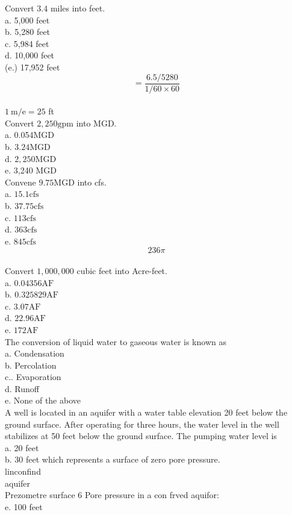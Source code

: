 Convert $3.4$ miles into feet.\\
a. 5,000 feet\\
b. 5,280 feet\\
c. 5,984 feet\\
d. 10,000 feet\\
(e.) 17,952 feet\\
$$=\frac{6.5 / 5280}{1 / 60 \times 60}$$\\
$1 \mathrm{~m} / \mathrm{e}=25$ ft\\

Convert $2,250 \mathrm{gpm}$ into MGD.\\
a. 0.054MGD\\
b. $3.24 \mathrm{MGD}$\\
d. $2,250 \mathrm{MGD}$\\
e. 3,240 MGD\\

Convene $9.75 \mathrm{MGD}$ into cfs.\\
a.  $15.1 \mathrm{cfs}$\\
b. $37.75 \mathrm{cfs}$\\
c. $113 \mathrm{cfs}$\\
d. $363 \mathrm{cfs}$\\
e. $845 \mathrm{cfs}$\\
$$236 \pi$$\\

Convert $1,000,000$ cubic feet into Acre-feet.\\
a. $0.04356 \mathrm{AF}$\\
b. $0.325829 \mathrm{AF}$\\
c. $3.07 \mathrm{AF}$\\
d. $22.96 \mathrm{AF}$\\
e. $172 \mathrm{AF}$\\

The conversion of liquid water to gaseous water is known as\\
a. Condensation\\
b. Percolation\\
c.. Evaporation\\
d. Runoff\\
e. None of the above\\

A well is located in an aquifer with a water table elevation 20 feet below the ground surface. After operating for three hours, the water level in the well stabilizes at 50 feet below the ground surface. The pumping water level is\\
a. 20 feet\\
b. 30 feet which represents a surface of zero pore pressure.\\
linconfind\\
aquifer\\
Prezometre surface 6 Pore pressure in a con frved aquifor:\\
e. 100 feet\\

